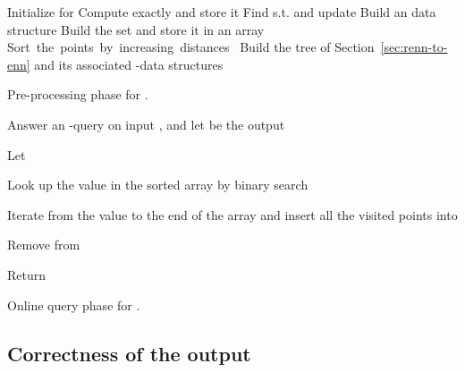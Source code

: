 \begin{algorithm}[!htb]
\LinesNumbered


  \BlankLine

  Initialize  for \;
  \ForEach{} {
    Compute  exactly and store it\;
    Find  s.t.  and
    update \;
  }
  \ForEach{} {
    Build an  data structure\;
  }
  \ForEach{} {
    Build the set  and store it in an array  \;
    \mbox{Sort the points  by increasing distances } \;
  }
  Build the tree  of
  Section~\ref{sec:renn-to-enn} and its associated -\pleb data
  structures \;
\caption{\small Pre-processing phase for \rnn.}
  \label{alg:rnnpre}
\end{algorithm}
\begin{algorithm}[!htb]
\LinesNumbered


  \BlankLine

Answer an -\nn query on input , and let   be the output \;
  \For{} { 
  }

  Let  \; 


  Look up the value  in the sorted array  by binary search \;

  Iterate from the  value  to the end of the array  and insert all the visited points into  \;


  \ForEach{ } {
    \If{} {
        Remove  from \;
    }
  }

  Return  \;
\caption{\small Online query phase for \rnn.}
  \label{alg:rnnquery}
\end{algorithm}




\subsection{Correctness of the output}
\label{rnn_correctness}

